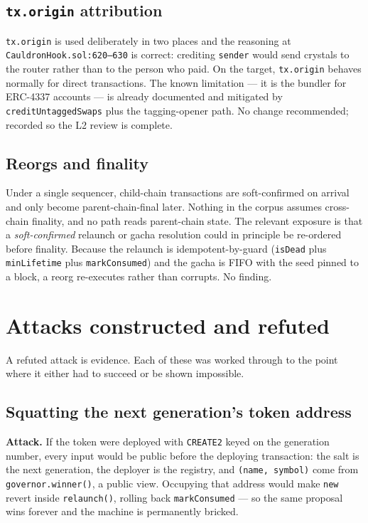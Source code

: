 \documentclass[11pt,a4paper]{article}
\newcommand{\code}[1]{\texttt{\small #1}}
\newcommand{\fileref}[1]{\texttt{\scriptsize #1}}
\begin{document}
\subsection{\texorpdfstring{\code{tx.origin}}{tx.origin} attribution}

\code{tx.origin} is used deliberately in two places and the reasoning at
\fileref{CauldronHook.sol:620--630} is correct: crediting \code{sender} would send
crystals to the router rather than to the person who paid. On the target,
\code{tx.origin} behaves normally for direct transactions. The known limitation
--- it is the bundler for ERC-4337 accounts --- is already documented and mitigated
by \code{creditUntaggedSwaps} plus the tagging-opener path. No change recommended;
recorded so the L2 review is complete.

\subsection{Reorgs and finality}

Under a single sequencer, child-chain transactions are soft-confirmed on arrival
and only become parent-chain-final later. Nothing in the corpus assumes
cross-chain finality, and no path reads parent-chain state. The relevant exposure
is that a \emph{soft-confirmed} relaunch or gacha resolution could in principle be
re-ordered before finality. Because the relaunch is idempotent-by-guard
(\code{isDead} plus \code{minLifetime} plus \code{markConsumed}) and the gacha is
FIFO with the seed pinned to a block, a reorg re-executes rather than corrupts.
No finding.

\newpage
\section{Attacks constructed and refuted}
\label{sec:failed}

A refuted attack is evidence. Each of these was worked through to the point where
it either had to succeed or be shown impossible.

\subsection*{Squatting the next generation's token address}
\textbf{Attack.} If the token were deployed with \code{CREATE2} keyed on the
generation number, every input would be public before the deploying transaction:
the salt is the next generation, the deployer is the registry, and \code{(name,
symbol)} come from \code{governor.winner()}, a public view. Occupying that address
would make \code{new} revert inside \code{relaunch()}, rolling back
\code{markConsumed} --- so the same proposal wins forever and the machine is
permanently bricked.
\end{document}
